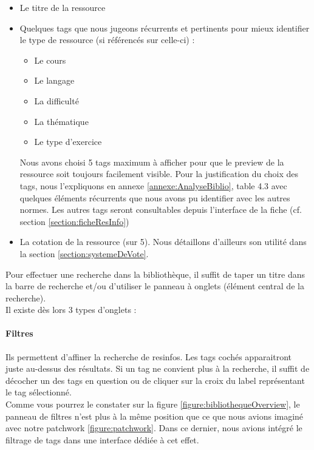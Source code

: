 \begin{itemize}
    \item Le titre de la ressource
    \item Quelques \glspl{tag} que nous jugeons récurrents et pertinents pour mieux identifier le type de ressource (si référencés sur celle-ci) : 
    \begin{itemize}
        \item Le cours
        \item Le langage
        \item La difficulté
        \item La thématique
        \item Le type d'exercice
    \end{itemize}
    Nous avons choisi 5 \glspl{tag} maximum à afficher pour que le preview de la ressource soit toujours facilement visible. Pour la justification du choix des \glspl{tag}, nous l'expliquons en annexe \ref{annexe:AnalyseBiblio}, table 4.3 avec quelques éléments récurrents que nous avons pu identifier avec les autres normes.
    Les autres \glspl{tag} seront consultables depuis l'interface de la \gls{fiche} (cf. section \ref{section:ficheResInfo})
    \item La cotation de la ressource (sur 5). Nous détaillons d'ailleurs son utilité dans la section \ref{section:systemeDeVote}.
\end{itemize}

\label{section:panneau}

Pour effectuer une recherche dans la bibliothèque, il suffit de taper un titre dans la barre de recherche et/ou d'utiliser le panneau à onglets (élément central de la recherche).\\

Il existe dès lors 3 types d'onglets :

\paragraph{Filtres} Ils permettent d'affiner la recherche de \glspl{resinfo}. Les \glspl{tag} cochés apparaitront juste au-dessus des résultats. Si un \gls{tag} ne convient plus à la recherche, il suffit de décocher un des tags en question ou de cliquer sur la croix du label représentant le \gls{tag} sélectionné.\\

Comme vous pourrez le constater sur la figure \ref{figure:bibliothequeOverview}, le panneau de filtres n'est plus à la même position que ce que nous avions imaginé avec notre patchwork \ref{figure:patchwork}. Dans ce dernier, nous avions intégré le filtrage de \glspl{tag} dans une interface dédiée à cet effet.\\


